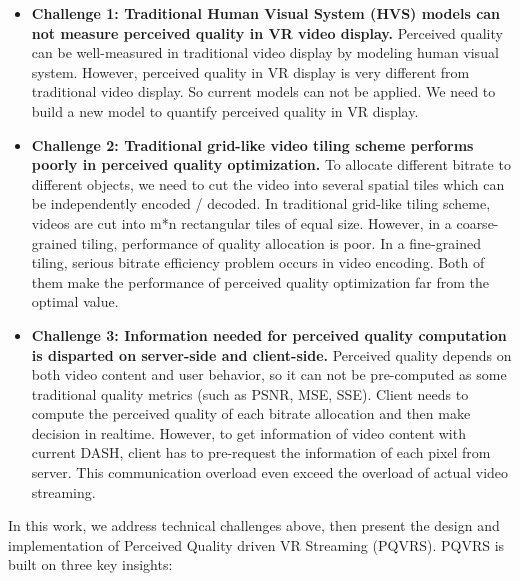 \begin{itemize}

\item \textbf{Challenge 1: Traditional Human Visual System (HVS) models can not measure perceived quality in VR video display.} Perceived quality can be well-measured in traditional video display by modeling human visual system. However, perceived quality in VR display is very different from traditional video display. So current models can not be applied. We need to build a new model to quantify perceived quality in VR display.

\item \textbf{Challenge 2: Traditional grid-like video tiling scheme performs poorly in perceived quality optimization.} To allocate different bitrate to different objects, we need to cut the video into several spatial tiles which can be independently encoded / decoded. In traditional grid-like tiling scheme, videos are cut into m*n rectangular tiles of equal size. However, in a coarse-grained tiling, performance of quality allocation is poor. In a fine-grained tiling, serious bitrate efficiency problem occurs in video encoding. Both of them make the performance of perceived quality optimization far from the optimal value.

\item \textbf{Challenge 3: Information needed for perceived quality computation is disparted on server-side and client-side.} Perceived quality depends on both video content and user behavior, so it can not be pre-computed as some traditional quality metrics (such as PSNR, MSE, SSE). Client needs to compute the perceived quality of each bitrate allocation and then make decision in realtime. However, to get information of video content with current DASH, client has to pre-request the information of each pixel from server. This communication overload even exceed the overload of actual video streaming.

\end{itemize}

In this work, we address technical challenges above, then present the design and implementation of Perceived Quality driven VR Streaming (PQVRS). PQVRS is built on three key insights:

